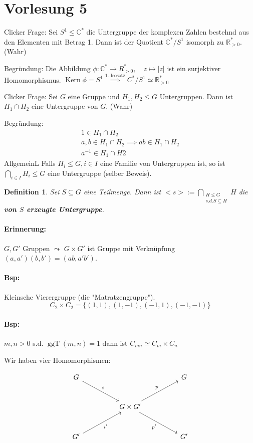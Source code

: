 \documentclass{article}
\theoremstyle{plain}
\newtheorem{definition}{Definition}
\renewcommand{\ker}{\mathop{\mathrm{Kern}}}
\newcommand{\defn}[1]{\textbf{#1}}
\newcommand{\defeq}{:=}
\newcommand{\R}{\mathbb{R}}
\newcommand{\C}{\mathbb{C}}
\newcommand{\ug}{\leq}
\newcommand{\zykl}[1]{{<}{#1}{>}}
\newcommand{\ggt}{\mathop{\text{ggT}}}
\newcommand{\iso}{\simeq}
\begin{document}
\section*{Vorlesung 5}

Clicker Frage: Sei $S^1 \ug \C^*$ die Untergruppe der komplexen Zahlen bestehnd aus den Elementen mit Betrag 1. Dann ist der Quotient $\C^*/S^1$ isomorph zu $\R^*_{>0}$. (Wahr)

Begründung:
Die Abbildung $\phi\colon\C^*\to R^*_{>0}, \quad z\mapsto |z|$ ist ein surjektiver Homomorphismus. 
$\ker\phi=S^1 \overset{\text{1. Isosatz}}{\implies} C^*/S^1\iso \R^*_{>0}$

Clicker Frage: Sei $G$ eine Gruppe und $H_1,H_2\ug G$ Untergruppen. Dann ist $H_1\cap H_2$ eine Untergruppe von $G$. (Wahr)

Begründung:
\begin{gather*}
    1\in H_1\cap H_2\\
    a,b\in H_1\cap H_2\implies ab\in H_1\cap H_2\\
    a^{-1}\in H_1\cap H2
\end{gather*}
AllgemeinL Falls $H_i\ug G, i\in I$ eine Familie von Untergruppen ist, so ist $\bigcap\limits_{i\in I}H_i\ug G$ eine Untergruppe (selber Beweis).

\begin{definition}
    Sei $S\subseteq G$ eine Teilmenge. Dann ist $\zykl{s}\defeq \bigcap\limits_{\substack{H\ug G \\s.d. S\subseteq H}}H$ die \defn{von $S$ erzeugte Untergruppe}.
\end{definition}
\paragraph{Erinnerung:} $G,G'$ Gruppen $\leadsto$ $G\times G'$ ist Gruppe mit Verknüpfung $(a,a')(b,b')=(ab,a'b')$.
\paragraph{Bsp:} Kleinsche Vierergruppe (die "Matratzengruppe").
$$C_2\times C_2 =\{(1,1),(1,-1),(-1,1),(-1,-1)\}$$
\paragraph{Bsp:} $m,n>0$ s.d. $\ggt(m,n)=1$ dann ist $C_{mn}\iso C_m\times C_n$

Wir haben vier Homomorphismen:

\[
\begin{tikzcd}[row sep=large, column sep=huge]
G \arrow[dr,"i"] & & G \\
& G\times G' \arrow[ur,"p"] \arrow[dr,swap,"p'"] & \\
G' \arrow[ur,swap,"i'"] & & G'
\end{tikzcd}
\]
\end{document}
